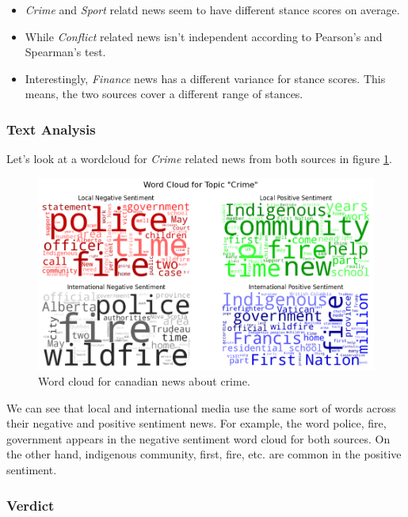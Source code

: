 \documentclass{article}
\theoremstyle{mytheoremstyle}
\theoremstyle{mytheoremstyle}
\theoremstyle{myproblemstyle}
\begin{document}
    \begin{itemize}
        \item \emph{Crime} and \emph{Sport} relatd news seem to have different stance scores on average.
        \item While \emph{Conflict} related news isn't independent according to Pearson's and Spearman's test.
        \item Interestingly, \emph{Finance} news has a different variance for stance scores. This means, the two sources cover a different range of stances.
    \end{itemize}

    \subsubsection{Text Analysis}

    Let's look at a wordcloud for \emph{Crime} related news from both sources in figure \ref{fig:canada_sentiment_score_wordcloud}.

    \begin{figure}[hp]
        \centering
        \includegraphics[width=\linewidth]{../images/plots/Canada/canada_wordcloud_crime.png}
        \caption{Word cloud for canadian news about crime.}
        \label{fig:canada_sentiment_score_wordcloud}
    \end{figure}

    We can see that local and international media use the same sort of words across their negative and positive sentiment news. For example, the word police, fire, government appears in the negative sentiment word cloud for both sources. On the other hand, indigenous community, first, fire, etc. are common in the positive sentiment.

    \subsubsection{Verdict}
\end{document}
